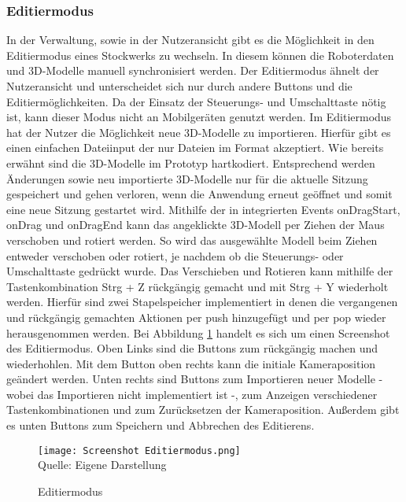\subsubsection{Editiermodus}\label{sec:EditMode}
In der Verwaltung, sowie in der Nutzeransicht gibt es die Möglichkeit in den Editiermodus eines Stockwerks zu wechseln. In diesem können die Roboterdaten und 3D-Modelle manuell synchronisiert werden. Der Editiermodus ähnelt der Nutzeransicht und unterscheidet sich nur durch andere Buttons und die Editiermöglichkeiten. Da der Einsatz der Steuerungs- und Umschalttaste nötig ist, kann dieser Modus nicht an Mobilgeräten genutzt werden. Im Editiermodus hat der Nutzer die Möglichkeit neue 3D-Modelle zu importieren. Hierfür gibt es einen einfachen Dateiinput der nur Dateien im \glb{} Format akzeptiert. Wie bereits erwähnt sind die 3D-Modelle im Prototyp hartkodiert. Entsprechend werden Änderungen sowie neu importierte 3D-Modelle nur für die aktuelle Sitzung gespeichert und gehen verloren, wenn die Anwendung erneut geöffnet und somit eine neue Sitzung gestartet wird. Mithilfe der in \deckgl{} integrierten Events onDragStart, onDrag und onDragEnd \cite{DeckglInteractivity} kann das angeklickte 3D-Modell per Ziehen der Maus verschoben und rotiert werden. So wird das ausgewählte Modell beim Ziehen entweder verschoben oder rotiert, je nachdem ob die Steuerungs- oder Umschalttaste gedrückt wurde. Das Verschieben und Rotieren kann mithilfe der Tastenkombination Strg + Z rückgängig gemacht und mit Strg + Y wiederholt werden. Hierfür sind zwei Stapelspeicher implementiert in denen die vergangenen und rückgängig gemachten Aktionen per push hinzugefügt und per pop wieder herausgenommen werden. Bei Abbildung \ref{fig:EditmodeScreenshot} handelt es sich um einen Screenshot des Editiermodus. Oben Links sind die Buttons zum rückgängig machen und wiederhohlen. Mit dem Button oben rechts kann die initiale Kameraposition geändert werden. Unten rechts sind Buttons zum Importieren neuer Modelle - wobei das Importieren nicht implementiert ist -, zum Anzeigen verschiedener Tastenkombinationen und zum Zurücksetzen der Kameraposition. Außerdem gibt es unten Buttons zum Speichern und Abbrechen des Editierens.

\begin{figure}[H]
    \caption{Editiermodus}\label{fig:EditmodeScreenshot}
    \texttt{[image: Screenshot Editiermodus.png]}
    \\
    Quelle: Eigene Darstellung
\end{figure}

